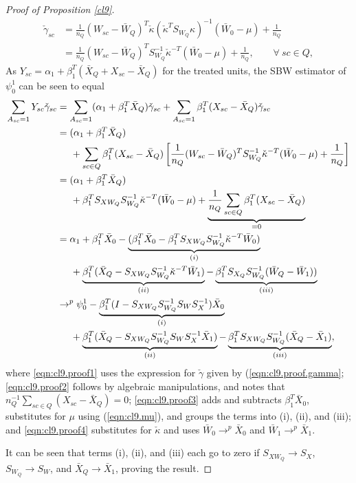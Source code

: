 \begin{proof}[Proof of Proposition \ref{cl9}]
\begin{align}
 \nonumber \check{\gamma}_{sc} & = \frac{1}{n_Q}(W_{sc} - \bar{W}_Q)^T \check{\kappa} (\check{\kappa}^T S_{W_Q} \kappa)^{-1}(\bar{W}_0 - \mu) + \frac{1}{n_Q} \\
 \label{eqn:cl9.proof.gamma}& = \frac{1}{n_Q}(W_{sc} - \bar{W}_Q)^T S_{W_Q}^{-1} \check{\kappa}^{-T}(\bar{W}_0 - \mu) + \frac{1}{n_Q}, \qquad \forall \ sc \in Q,
\end{align}
As $Y_{sc} = \alpha_1 + \beta_1^T (\bar{X}_Q + X_{sc} - \bar{X}_Q)$ for the treated units, the SBW estimator of $\psi_0^1$ can be seen to equal
\begin{align}
    \nonumber \sum_{A_{sc}=1} Y_{sc}\check{\gamma}_{sc} & = \sum_{A_{sc}=1} (\alpha_1 + \beta_1^T \bar{X}_Q) \check{\gamma}_{sc} + \sum_{A_{sc}=1}  \beta_1^T (X_{sc} - \bar{X}_Q)\check{\gamma}_{sc} \\
 \label{eqn:cl9.proof1}    & = (\alpha_1 + \beta_1^T \bar{X}_Q)\\
    \nonumber & \hskip.5cm {} + \sum_{sc \in Q}  \beta_1^T(X_{sc} - \bar{X}_Q)\left[\frac{1}{n_Q} (W_{sc} - \bar{W}_Q)^T S_{W_Q}^{-1} \check{\kappa}^{-T}(\bar{W}_0 - \mu) +  \frac{1}{n_Q}\right] \\
\label{eqn:cl9.proof2}    & = (\alpha_1 + \beta_1^T \bar{X}_Q)\\
    \nonumber & \hskip.5cm {} +  \beta_1^TS_{XW_Q} S_{W_Q}^{-1} \check{\kappa}^{-T}(\bar{W}_0 - \mu) + \underbrace{\frac{1}{n_Q}\sum_{sc \in Q}   \beta_1^T (X_{sc} - \bar{X}_Q) }_{= 0} \\ %
\label{eqn:cl9.proof3}    & = \alpha_1 + \beta_1^T \bar{X}_0 - \underbrace{(\beta_1^T \bar{X}_0 -  \beta_1^TS_{XW_Q} S_{W_Q}^{-1} \check{\kappa}^{-T}\bar{W}_0)}_{(i)} \\
    \nonumber & \hskip.5cm {} + \underbrace{\beta_1^T (\bar{X}_Q - S_{XW_Q} S_{W_Q}^{-1} \check{\kappa}^{-T}\bar{W}_1)}_{(ii)} - \underbrace{\beta_1^TS_{X_Q}S_{W_Q}^{-1}(\bar{W}_Q - \bar{W}_1))}_{(iii)}\\
\label{eqn:cl9.proof4}    & \to^p \psi_0^1 - \underbrace{\beta_1^T(I - S_{XW_Q}S_{W_Q}^{-1}S_WS_X^{-1})\bar{X}_0}_{(i)} \\
    \nonumber & \hskip.5cm {} + \underbrace{\beta_1^T(\bar{X}_Q - S_{XW_Q}S_{W_Q}^{-1} S_W S_X^{-1} \bar{X}_1)}_{(ii)} - \underbrace{\beta_1^TS_{XW_Q}S_{W_Q}^{-1}(\bar{X}_Q - \bar{X}_1)}_{(iii)}, 
\end{align}
where \eqref{eqn:cl9.proof1} uses the expression for $\check{\gamma}$ given by (\ref{eqn:cl9.proof.gamma}; \eqref{eqn:cl9.proof2} follows by algebraic manipulations, and notes that $n_Q^{-1}\sum_{sc \in Q} (X_{sc} - \bar{X}_Q) = 0$; \eqref{eqn:cl9.proof3} adds and subtracts $\beta_1^T \bar{X}_0$,  substitutes for $\mu$ using (\ref{eqn:cl9.mu}), and groups the terms into (i), (ii), and (iii); and \eqref{eqn:cl9.proof4} substitutes for $\check{\kappa}$ and uses $\bar{W}_0 \to^p \bar{X}_0$ and $\bar{W}_1 \to^p \bar{X}_1$.

It can be seen that terms (i), (ii), and (iii) each go to zero if $S_{XW_Q} \to S_X$, $S_{W_Q} \to S_W$, and $\bar{X}_Q \to \bar{X}_1$, proving the result. 
\end{proof}
